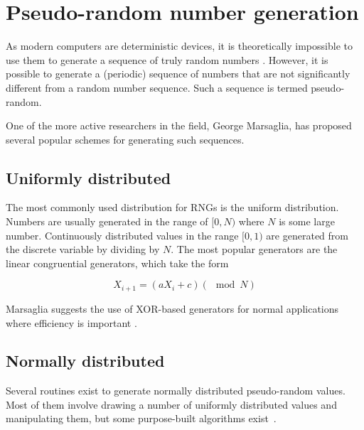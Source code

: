 
\section{Pseudo-random number generation}

As modern computers are deterministic devices, it is theoretically
impossible to use them to generate a sequence of truly random numbers
\citehere.  However, it is possible to generate a (periodic) sequence
of numbers that are not significantly different from a random number
sequence.  Such a sequence is termed pseudo-random.

One of the more active researchers in the field, George Marsaglia, has
proposed several popular schemes for generating such sequences. \citehere

\subsection{Uniformly distributed}
The most commonly used distribution for RNGs is the uniform distribution. 
Numbers are usually generated in the range of $[0, N)$ where $N$ is some large
number.  Continuously distributed values in the range $[0,1)$ are generated from
the discrete variable by dividing  by  $N$. The most popular generators are the
linear congruential generators, which take the form 

\begin{equation}
X_{i+1} = (aX_i +c) (\mod N)
\end{equation}

Marsaglia suggests the use of XOR-based generators for normal
applications where efficiency is important \citehere.

\subsection{Normally distributed}
Several routines exist to generate normally distributed pseudo-random
values.  Most of them involve drawing a number of uniformly
distributed values and manipulating them, but some purpose-built
algorithms exist~\citehere.

